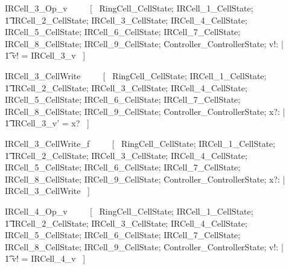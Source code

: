 \documentclass{article}
\begin{document}
\begin{zed}
IRCell\_3\_Op\_v ~~~~ [~ 
    \Xi RingCell\_CellState; 
    \Xi IRCell\_1\_CellState; \\
    \t1 \Xi IRCell\_2\_CellState; 
    \Xi IRCell\_3\_CellState;
    \Xi IRCell\_4\_CellState; 
    \Xi IRCell\_5\_CellState; 
    \Xi IRCell\_6\_CellState; 
    \Xi IRCell\_7\_CellState; 
    \Xi IRCell\_8\_CellState; 
    \Xi IRCell\_9\_CellState; 
    \Xi Controller\_ControllerState; v!: \nat | \\
    \t1 v! = IRCell\_3\_v ~] \\
\end{zed}

\begin{zed}
IRCell\_3\_CellWrite ~~~~ [~ 
    \Xi RingCell\_CellState; 
    \Xi IRCell\_1\_CellState; \\
    \t1 \Xi IRCell\_2\_CellState; 
    \Delta IRCell\_3\_CellState;
    \Xi IRCell\_4\_CellState; 
    \Xi IRCell\_5\_CellState; 
    \Xi IRCell\_6\_CellState; 
    \Xi IRCell\_7\_CellState; 
    \Xi IRCell\_8\_CellState; 
    \Xi IRCell\_9\_CellState; 
    \Xi Controller\_ControllerState; 
    x?: \nat | \\
    \t1 IRCell\_3\_v' = x? ~] \\
\end{zed}

\begin{zed}
IRCell\_3\_CellWrite\_f ~~~~ [~ 
    \Xi RingCell\_CellState; 
    \Xi IRCell\_1\_CellState; \\
    \t1 \Xi IRCell\_2\_CellState; 
    \Xi IRCell\_3\_CellState;
    \Xi IRCell\_4\_CellState; 
    \Xi IRCell\_5\_CellState; 
    \Xi IRCell\_6\_CellState; 
    \Xi IRCell\_7\_CellState; 
    \Xi IRCell\_8\_CellState; 
    \Xi IRCell\_9\_CellState; 
    \Xi Controller\_ControllerState; 
    x?: \nat | \\
    \lnot \pre IRCell\_3\_CellWrite ~] \\
\end{zed}
\begin{zed}
IRCell\_4\_Op\_v ~~~~ [~ 
    \Xi RingCell\_CellState; 
    \Xi IRCell\_1\_CellState; \\
    \t1 \Xi IRCell\_2\_CellState; 
    \Xi IRCell\_3\_CellState;
    \Xi IRCell\_4\_CellState; 
    \Xi IRCell\_5\_CellState; 
    \Xi IRCell\_6\_CellState; 
    \Xi IRCell\_7\_CellState; 
    \Xi IRCell\_8\_CellState; 
    \Xi IRCell\_9\_CellState; 
    \Xi Controller\_ControllerState; v!: \nat | \\
    \t1 v! = IRCell\_4\_v ~] \\
\end{zed}
\end{document}

